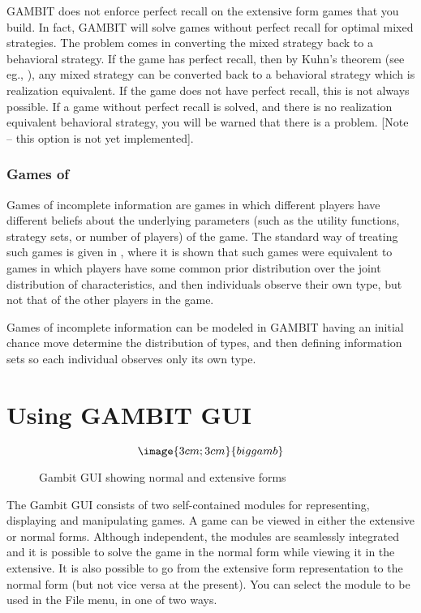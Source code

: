 GAMBIT does not enforce perfect recall on the extensive form games that
you build.  In fact, GAMBIT will solve games without perfect recall for
 optimal
mixed strategies.  The problem comes in converting the mixed strategy back
to a behavioral strategy.  If the game has perfect recall, then by Kuhn's
theorem (see eg., \cite{vanDamme:1983}), any mixed strategy can be
converted back to a behavioral strategy which is realization equivalent.  
If the game does not have perfect recall, this is not always possible.  If
a game without perfect recall is solved, and there is no realization
equivalent behavioral strategy, you will be warned that there is a
problem. [Note -- this option is not yet implemented].  
 

\subsection{Games of }\label{incinfsec}
Games of incomplete information are games in which different players have 
different beliefs about the underlying parameters (such as the utility 
functions, strategy sets, or number of players) of the game.  The standard 
way of treating such games is given in \cite{Harsanyi:1967}, where it
is shown that 
 such games were equivalent to games in which players have some common
prior distribution over the joint distribution of characteristics, and
 then individuals observe their own type, but not that of the other players 
in the game.  

Games of incomplete information can be modeled in GAMBIT having an
initial chance move determine the distribution of types, and then
defining information sets so each individual observes only its own
type.

\chapter{Using GAMBIT GUI}

\begin{figure}
$$\image{3cm;3cm}{biggamb}$$
\caption{Gambit GUI showing normal and extensive
forms}\label{fig_biggamb}
\end{figure}

The Gambit GUI consists of two self-contained modules for representing,
displaying and manipulating games.  A game can be viewed in either the
extensive or normal forms.  Although independent, the modules are
seamlessly integrated and it is possible to solve the game in the normal
form while viewing it in the extensive.  It is also possible to go from
the extensive form representation to the normal form (but not vice versa
at the present).   You can select the module to be used in the File menu,
in one of two ways.

